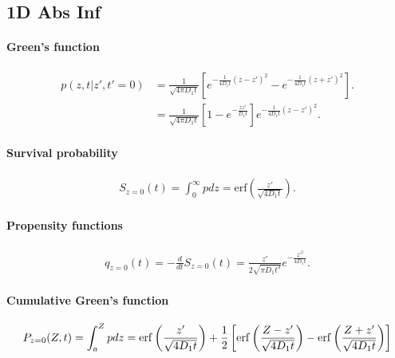 
\subsection{1D Abs Inf}

\paragraph{Green's function}
\begin{align}
 p(z,t|z',t'=0)	&= \frac{1}{\sqrt{4\pi D_1t}} \left[ e^{-\frac{1}{4D_1t}(z-z')^2} - e^{-\frac{1}{4D_1t}(z+z')^2} \right].	\\
		&= \frac{1}{\sqrt{4\pi D_1t}} \left[ 1 - e^{-\frac{zz'}{D_1t}} \right]e^{-\frac{1}{4D_1t}(z-z')^2}.
\end{align}

\paragraph{Survival probability}
\begin{align}
  S_{z=0}(t) = \int_0^\infty p dz =
  \text{erf}\left( \frac{z'}{\sqrt{4D_1 t}} \right).
\end{align}

\paragraph{Propensity functions}
\begin{align}
  q_{z=0}(t) = -\frac{d}{dt} S_{z=0}(t)=
  \frac{z'}{2\sqrt{\pi D_1 t^3}} e^{-\frac{z'^2}{4D_1t}}.
\end{align}

\paragraph{Cumulative Green's function}
\begin{align}
  P_{z=0}(Z,t) = \int_a^Z p dz =
  \operatorname{erf}{\left(\frac{z'}{\sqrt{4D_1t}}\right)}
  + \frac{1}{2} \left[ \operatorname{erf}{\left(\frac{Z-z'}{\sqrt{4D_1t}}\right)} - \operatorname{erf}{\left(\frac{Z+z'}{\sqrt{4D_1t}}\right)} \right]
\end{align}